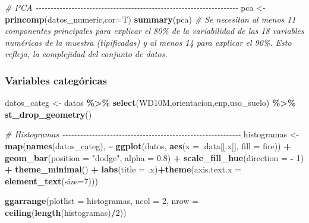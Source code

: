 \documentclass[12pt,a4paper,]{book}
\newenvironment{Shaded}{\begin{snugshade}}{\end{snugshade}}
\newcommand{\AttributeTok}[1]{\textcolor[rgb]{0.13,0.29,0.53}{#1}}
\newcommand{\CommentTok}[1]{\textcolor[rgb]{0.56,0.35,0.01}{\textit{#1}}}
\newcommand{\DecValTok}[1]{\textcolor[rgb]{0.00,0.00,0.81}{#1}}
\newcommand{\FloatTok}[1]{\textcolor[rgb]{0.00,0.00,0.81}{#1}}
\newcommand{\FunctionTok}[1]{\textcolor[rgb]{0.13,0.29,0.53}{\textbf{#1}}}
\newcommand{\NormalTok}[1]{#1}
\newcommand{\OtherTok}[1]{\textcolor[rgb]{0.56,0.35,0.01}{#1}}
\newcommand{\SpecialCharTok}[1]{\textcolor[rgb]{0.81,0.36,0.00}{\textbf{#1}}}
\newcommand{\StringTok}[1]{\textcolor[rgb]{0.31,0.60,0.02}{#1}}
\numberwithin{dummy}{section}
\theoremstyle{ocrenumbox}
\theoremstyle{blacknumex}
\theoremstyle{blacknumbox}
\theoremstyle{ocrenum}
\theoremstyle{ocrenum}
\begin{document}
\begin{Shaded}
\begin{Highlighting}[]
\CommentTok{\# PCA {-}{-}{-}{-}{-}{-}{-}{-}{-}{-}{-}{-}{-}{-}{-}{-}{-}{-}{-}{-}{-}{-}{-}{-}{-}{-}{-}{-}{-}{-}{-}{-}{-}{-}{-}{-}{-}{-}{-}{-}{-}{-}{-}{-}{-}{-}{-}{-}{-}{-}{-}{-}{-}{-}{-}{-}{-}{-}{-}{-}{-}{-}{-}{-}{-}{-}{-}{-}}
\NormalTok{pca }\OtherTok{\textless{}{-}} \FunctionTok{princomp}\NormalTok{(datos\_numeric,}\AttributeTok{cor=}\NormalTok{T)}
\FunctionTok{summary}\NormalTok{(pca) }
\CommentTok{\# Se necesitan al menos 11 componentes principales para explicar el 80\% de la variabilidad de las 18 variables numéricas de la muestra (tipificadas) y al menos 14 para explicar el 90\%. Esto refleja, la complejidad del conjunto de datos.}
\end{Highlighting}
\end{Shaded}

\hypertarget{variables-categuxf3ricas}{%
\subsubsection*{Variables categóricas}\label{variables-categuxf3ricas}}

\begin{Shaded}
\begin{Highlighting}[]
\NormalTok{datos\_categ }\OtherTok{\textless{}{-}}\NormalTok{ datos }\SpecialCharTok{\%\textgreater{}\%}  
  \FunctionTok{select}\NormalTok{(WD10M,orientacion,enp,uso\_suelo) }\SpecialCharTok{\%\textgreater{}\%} 
  \FunctionTok{st\_drop\_geometry}\NormalTok{()}

\CommentTok{\# Histogramas {-}{-}{-}{-}{-}{-}{-}{-}{-}{-}{-}{-}{-}{-}{-}{-}{-}{-}{-}{-}{-}{-}{-}{-}{-}{-}{-}{-}{-}{-}{-}{-}{-}{-}{-}{-}{-}{-}{-}{-}{-}{-}{-}{-}{-}{-}{-}{-}{-}{-}{-}{-}{-}{-}{-}{-}{-}{-}{-}{-}}
\NormalTok{histogramas }\OtherTok{\textless{}{-}} \FunctionTok{map}\NormalTok{(}\FunctionTok{names}\NormalTok{(datos\_categ), }\SpecialCharTok{\textasciitilde{}} \FunctionTok{ggplot}\NormalTok{(datos, }\FunctionTok{aes}\NormalTok{(}\AttributeTok{x =}\NormalTok{ .data[[.x]], }\AttributeTok{fill =}\NormalTok{ fire)) }\SpecialCharTok{+}
                    \FunctionTok{geom\_bar}\NormalTok{(}\AttributeTok{position =} \StringTok{"dodge"}\NormalTok{, }\AttributeTok{alpha =} \FloatTok{0.8}\NormalTok{) }\SpecialCharTok{+}
                    \FunctionTok{scale\_fill\_hue}\NormalTok{(}\AttributeTok{direction =} \SpecialCharTok{{-}} \DecValTok{1}\NormalTok{) }\SpecialCharTok{+}
                    \FunctionTok{theme\_minimal}\NormalTok{() }\SpecialCharTok{+}
                    \FunctionTok{labs}\NormalTok{(}\AttributeTok{title =}\NormalTok{ .x)}\SpecialCharTok{+}\FunctionTok{theme}\NormalTok{(}\AttributeTok{axis.text.x =} \FunctionTok{element\_text}\NormalTok{(}\AttributeTok{size=}\DecValTok{7}\NormalTok{)))}

\FunctionTok{ggarrange}\NormalTok{(}\AttributeTok{plotlist =}\NormalTok{ histogramas, }\AttributeTok{ncol =} \DecValTok{2}\NormalTok{, }\AttributeTok{nrow =} \FunctionTok{ceiling}\NormalTok{(}\FunctionTok{length}\NormalTok{(histogramas)}\SpecialCharTok{/}\DecValTok{2}\NormalTok{))}
\end{Highlighting}
\end{Shaded}
\end{document}

